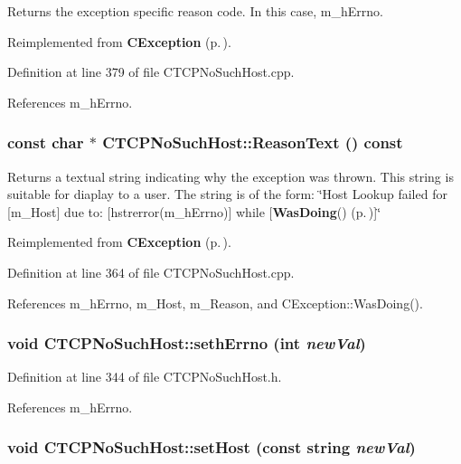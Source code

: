 Returns the exception specific reason code. In this case, m\_\-h\-Errno. 

Reimplemented from {\bf CException} {\rm (p.\,\pageref{classCException_a9})}.

Definition at line 379 of file CTCPNo\-Such\-Host.cpp.

References m\_\-h\-Errno.
\subsubsection{\setlength{\rightskip}{0pt plus 5cm}const char $\ast$ CTCPNo\-Such\-Host::Reason\-Text () const\hspace{0.3cm}{\tt  [virtual]}}\label{classCTCPNoSuchHost_a7}


Returns a textual string indicating why the exception was thrown. This string is suitable for diaplay to a user. The string is of the form: \char`\"{}Host Lookup failed for [m\_\-Host] due to: [hstrerror(m\_\-h\-Errno)]  while [{\bf Was\-Doing}() {\rm (p.\,\pageref{classCException_a10})}]\char`\"{} 

Reimplemented from {\bf CException} {\rm (p.\,\pageref{classCException_a8})}.

Definition at line 364 of file CTCPNo\-Such\-Host.cpp.

References m\_\-h\-Errno, m\_\-Host, m\_\-Reason, and CException::Was\-Doing().
\subsubsection{\setlength{\rightskip}{0pt plus 5cm}void CTCPNo\-Such\-Host::seth\-Errno (int {\em new\-Val})\hspace{0.3cm}{\tt  [inline, protected]}}\label{classCTCPNoSuchHost_b0}




Definition at line 344 of file CTCPNo\-Such\-Host.h.

References m\_\-h\-Errno.
\subsubsection{\setlength{\rightskip}{0pt plus 5cm}void CTCPNo\-Such\-Host::set\-Host (const string {\em new\-Val})\hspace{0.3cm}{\tt  [inline, protected]}}\label{classCTCPNoSuchHost_b1}




